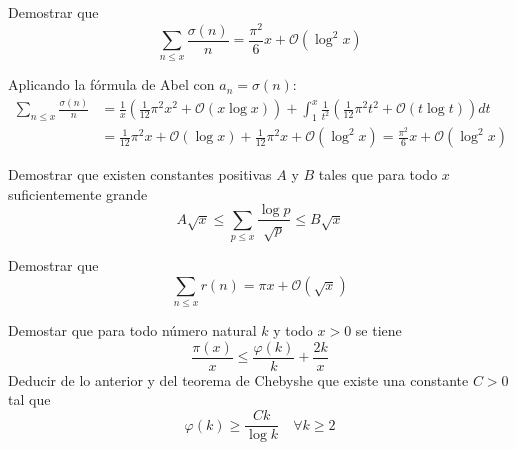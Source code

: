\documentclass[twoside]{article}
\begin{document}
\begin{ejercicio}{8}
Demostrar que
\[ \sum_{n≤x} \frac{σ(n)}{n} = \frac{π^2}{6} x + \mathcal{O}(\log^2 x) \]
\end{ejercicio}
\begin{sol}
Aplicando la fórmula de Abel con $a_n = σ(n)$:
\begin{align*}
	\sum_{n≤x} \frac{σ(n)}{n} & = \frac{1}{x}\left(\frac{1}{12}π^2x^2 + \mathcal{O}(x \log x)\right) + \int_1^x \frac{1}{t^2}\left(\frac{1}{12}π^2t^2 + \mathcal{O}(t \log t)\right)dt\\
	& = \frac{1}{12}π^2x + \mathcal{O}(\log x) + \frac{1}{12}π^2x + \mathcal{O}(\log^2 x) = \frac{π^2}{6}x + \mathcal{O}(\log^2 x)
\end{align*}
\end{sol}

\begin{ejercicio}{9}
Demostrar que existen constantes positivas $A$ y $B$ tales que para todo $x$ suficientemente grande
\[ A\sqrt{x} ≤ \sum_{p≤x} \frac{\log p}{\sqrt{p}} ≤ B \sqrt{x}\]
\end{ejercicio}
\begin{sol}
\end{sol}

\begin{ejercicio}{10}
Demostrar que
\[ \sum_{n≤x} r(n) = πx + \mathcal{O}(\sqrt{x}) \]
\end{ejercicio}

\begin{ejercicio}{11}
Demostar que para todo número natural $k$ y todo $x > 0$ se tiene
\[ \frac{π(x)}{x} ≤ \frac{φ(k)}{k} + \frac{2k}{x} \]
Deducir de lo anterior y del teorema de Chebyshe que existe una constante $C > 0$ tal que
\[ φ(k) ≥ \frac{Ck}{\log k} \quad \forall k≥2 \]
\end{ejercicio}
\end{document}
